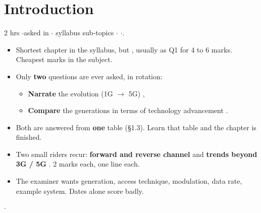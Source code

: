 \section{Introduction}

{\color{sub}\footnotesize 2 hrs \gap$\cdot$\gap asked in 
\gap$\cdot$ syllabus sub-topics \gap$\cdot$\gap {} \gap$\cdot$\gap {}.}

\begin{itemize}
  \item Shortest chapter in the syllabus, but , usually
        as Q1 for 4 to 6 marks. Cheapest marks in the subject.
  \item Only \textbf{two} questions are ever asked, in rotation:
  \begin{itemize}
    \item \textbf{Narrate} the evolution (1G $\rightarrow$ 5G) ,
    \item \textbf{Compare} the generations in terms of technology advancement .
  \end{itemize}
  \item Both are answered from \textbf{one} table (\S1.3). Learn that table and the chapter
        is finished.
  \item Two small riders recur: \textbf{forward and reverse channel}  and
        \textbf{trends beyond 3G / 5G} . 2 marks each, one line each.
  \item {} The examiner wants generation, access
        technique, modulation, data rate, example system. Dates alone score badly.
\end{itemize}

\hr


{\color{sub}\footnotesize {}  \gap$\cdot$\gap
{}}

